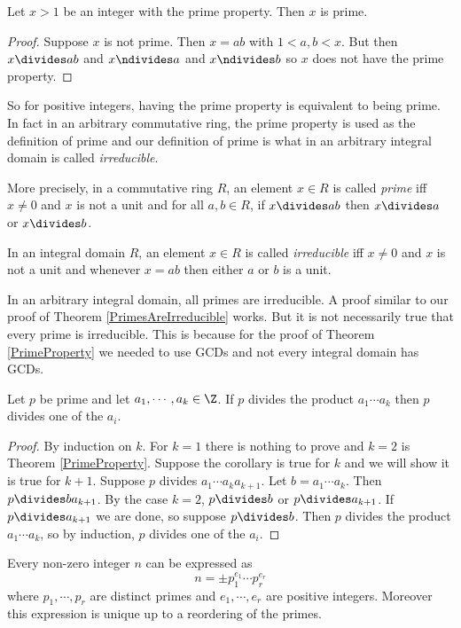 \documentclass[oneside,12pt]{amsart}
\begin{document}
\begin{theorem}
\label{PrimesAreIrreducible}
Let $x>1$ be an integer with the prime property. Then $x$ is prime.
\end{theorem}
\begin{proof}
Suppose $x$ is not prime. Then $x=ab$ with $1<a,b<x$. But then $x\divides ab$
and $x\ndivides a$ and $x\ndivides b$ so $x$ does not have the prime property.
\end{proof}

So for positive integers, having the prime property is equivalent to being
prime. In fact in an arbitrary commutative ring, the prime property is
used as the definition of prime and our definition of prime is what in an
arbitrary integral domain is called \emph{irreducible}.

More precisely, in a commutative ring $R$, an element $x\in R$ is called
\emph{prime} iff $x\not=0$ and $x$ is not a unit and for all $a,b\in R$, if $x\divides ab$ then
$x\divides a$ or $x\divides b$.

In an integral domain $R$, an element $x\in R$ is called \emph{irreducible}
iff $x\not=0$ and $x$ is not a unit and whenever $x = ab$ then either $a$ or $b$ is a unit.

In an arbitrary integral domain, all primes are irreducible. A proof similar to
our proof of Theorem \ref{PrimesAreIrreducible} works. But it is not necessarily
true that every prime is irreducible. This is because
for the proof of Theorem \ref{PrimeProperty} we needed to use GCDs and not
every integral domain has GCDs.

\begin{corollary}
\label{GeneralizedPrimeProperty}
Let $p$ be prime and let $a_1,\cdots,a_k\in\Z$. If $p$ divides the product
$a_1\cdots a_k$ then $p$ divides one of the $a_i$.
\end{corollary}
\begin{proof}
By induction on $k$. For $k=1$ there is nothing to prove and $k=2$ is
Theorem \ref{PrimeProperty}. Suppose the corollary is true for $k$ and
we will show it is true for $k+1$. Suppose $p$ divides $a_1\cdots a_k a_{k+1}$.
Let $b=a_1\cdots a_k$. Then $p\divides b a_{k+1}$. By the case $k=2$,
$p\divides b$ or $p\divides a_{k+1}$. If $p\divides a_{k+1}$ we are done,
so suppose $p\divides b$. Then $p$ divides the product $a_1\cdots a_k$, so
by induction, $p$ divides one of the $a_i$.
\end{proof}

\begin{theorem}
Every non-zero integer $n$ can be expressed as
$$n=\pm p_1^{e_1} \cdots p_r^{e_r}$$
where $p_1,\cdots,p_r$ are distinct primes and $e_1,\cdots,e_r$ are positive integers.
Moreover this expression is unique up to a reordering of the primes.
\end{theorem}
\end{document}
